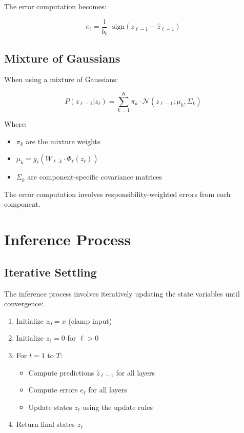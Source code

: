 \documentclass{article}
\begin{document}
The error computation becomes:

\begin{equation}
  e_\ell = \frac{1}{b_\ell} \cdot \text{sign}(z_{\ell-1} - \hat{z}_{\ell-1})
\end{equation}

\subsection{Mixture of Gaussians}

When using a mixture of Gaussians:

\begin{equation}
  P(z_{\ell-1}|z_\ell) = \sum_{k=1}^K \pi_k \cdot \mathcal{N}(z_{\ell-1}; \mu_k, \Sigma_k)
\end{equation}

Where:
\begin{itemize}
  \item $\pi_k$ are the mixture weights
  \item $\mu_k = g_\ell(W_{\ell,k} \cdot \Phi_\ell(z_\ell))$
  \item $\Sigma_k$ are component-specific covariance matrices
\end{itemize}

The error computation involves responsibility-weighted errors from each component.

\section{Inference Process}

\subsection{Iterative Settling}

The inference process involves iteratively updating the state variables until convergence:

\begin{enumerate}
  \item Initialize $z_0 = x$ (clamp input)
  \item Initialize $z_\ell = 0$ for $\ell > 0$
  \item For $t = 1$ to $T$:
  \begin{itemize}
    \item Compute predictions $\hat{z}_{\ell-1}$ for all layers
    \item Compute errors $e_\ell$ for all layers
    \item Update states $z_\ell$ using the update rules
  \end{itemize}
  \item Return final states $z_\ell$
\end{enumerate}
\end{document}
